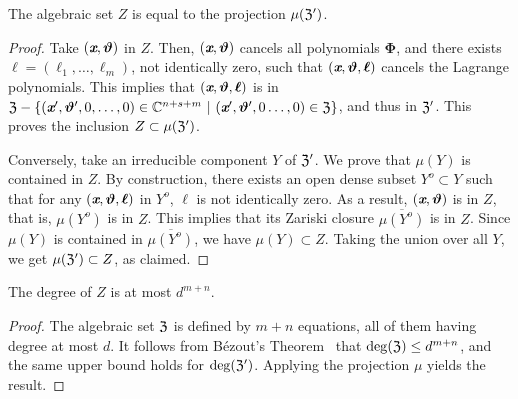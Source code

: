 \documentclass[sigconf]{acmart}
\def\thetab{\bm{\vartheta}}
\def\xb{\textit{\textbf{x}}}
\def\C{\mathbb{C}}
\def\dt{s}
\begin{document}
\begin{lemma}  
  The algebraic set $Z$ is equal to the projection $\mu(\frak{Z}')$.
\end{lemma}
\begin{proof}
  Take $(\xb,\thetab)$ in $Z$. Then, $(\xb,\thetab)$ cancels all
  polynomials $\bm \Phi$, and there exists $\bm
  \ell=(\ell_1,\dots,\ell_m)$, not identically zero, such that
  $(\xb,\thetab,\bm \ell)$ cancels the Lagrange polynomials. This
  implies that $(\xb,\thetab,\bm \ell)$ is in $\frak{Z} -
  \{(\textit{\textbf{x}}',\thetab',0,\hdots,0) \in
  \C^{n+\dt+m}~|~(\textit{\textbf{x}}',\thetab',0\hdots,0) \in
  \frak{Z}\}$, and thus in $\frak{Z}'$. This proves the inclusion
  $Z \subset \mu(\frak{Z}')$.

  Conversely, take an irreducible component $Y$ of $\frak Z'$. We prove 
  that $\mu(Y)$ is contained in $Z$.
  By construction, there exists an open dense subset $Y^o \subset Y$
  such that for any $(\xb,\thetab,\bm \ell)$ in $Y^o$, $\bm \ell$ is
  not identically zero. As a result, $(\xb,\thetab)$ is in $Z$, that
  is, $\mu(Y^o)$ is in $Z$. This implies that its Zariski closure
  $\overline{\mu(Y^o)}$ is in $Z$. Since $\mu(Y)$ is contained in
  $\overline{\mu(Y^o)}$, we have $\mu(Y) \subset Z$. Taking 
  the union over all $Y$, we get $\mu(\frak Z') \subset Z$, as claimed.
\end{proof}
%
\begin{corollary} 
  The degree of $Z$ is at most $d^{m+n}.$
\end{corollary}
\begin{proof}
  The algebraic set $\frak Z$ is defined by $m+n$ equations, all of
  them having degree at most $d$. It follows from B\'ezout's
  Theorem~\cite{H} that $\deg(\frak{Z}) \leq d^{m+n}$, and the same
  upper bound holds for $\deg(\frak{Z}')$. Applying the projection
  $\mu$ yields the result.
\end{proof}
\end{document}
